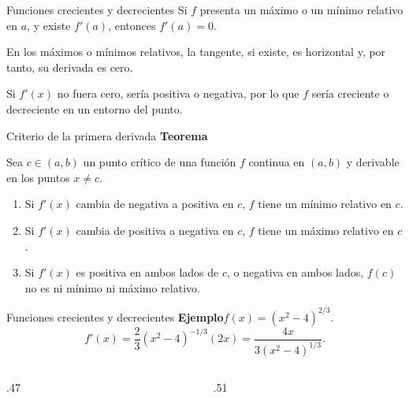\documentclass[original_version/main.tex]{subfiles}
\begin{document}
\begin{frame}{Funciones crecientes y decrecientes}
Si $f$ presenta un máximo o un mínimo relativo en $a$, y existe $f'(a)$, entonces $f'(a)=0$.
\medskip

En los máximos o mínimos relativos, la tangente, si existe, es horizontal y, por tanto, su derivada es cero.
\medskip

Si $f'(x)$ no fuera cero, sería positiva o negativa, por lo que $f$ sería creciente o decreciente en un entorno del punto.
\end{frame}
\begin{frame}{Criterio de la primera derivada}
\small\textbf{Teorema}\par Sea $c\in(a,b)$ un punto crítico de una función $f$ continua en $(a,b)$ y derivable en los puntos $x\ne c$.
\begin{enumerate}
\item Si $f'(x)$ cambia de negativa a positiva en $c$, $f$ tiene un mínimo relativo en $c$.
\item Si $f'(x)$ cambia de positiva a negativa en $c$, $f$ tiene un máximo relativo en $c$.
\item Si $f'(x)$ es positiva en ambos lados de $c$, o negativa en ambos lados, $f(c)$ no es ni mínimo ni máximo relativo.
\end{enumerate}
\end{frame}
\begin{frame}{Funciones crecientes y decrecientes}
\small\textbf{Ejemplo}\quad $f(x)=(x^2-4)^{2/3}$.
\[f'(x)=\frac23(x^2-4)^{-1/3}(2x)=\frac{4x}{3(x^2-4)^{1/3}}.\]
\begin{columns}[c]
\begin{column}{.47\textwidth}\end{column}
\begin{column}{.51\textwidth}\scriptsize
{}
\end{column}\end{columns}
\end{frame}
\end{document}
